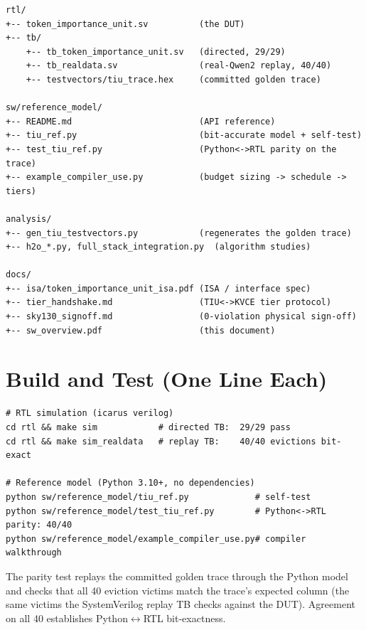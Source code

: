 \documentclass[11pt]{article}
\begin{document}
\begin{lstlisting}[basicstyle=\ttfamily\small]
rtl/
+-- token_importance_unit.sv          (the DUT)
+-- tb/
    +-- tb_token_importance_unit.sv   (directed, 29/29)
    +-- tb_realdata.sv                (real-Qwen2 replay, 40/40)
    +-- testvectors/tiu_trace.hex     (committed golden trace)

sw/reference_model/
+-- README.md                         (API reference)
+-- tiu_ref.py                        (bit-accurate model + self-test)
+-- test_tiu_ref.py                   (Python<->RTL parity on the trace)
+-- example_compiler_use.py           (budget sizing -> schedule -> tiers)

analysis/
+-- gen_tiu_testvectors.py            (regenerates the golden trace)
+-- h2o_*.py, full_stack_integration.py  (algorithm studies)

docs/
+-- isa/token_importance_unit_isa.pdf (ISA / interface spec)
+-- tier_handshake.md                 (TIU<->KVCE tier protocol)
+-- sky130_signoff.md                 (0-violation physical sign-off)
+-- sw_overview.pdf                   (this document)
\end{lstlisting}

\section{Build and Test (One Line Each)}
\label{sec:build}

\begin{lstlisting}[basicstyle=\ttfamily\small]
# RTL simulation (icarus verilog)
cd rtl && make sim            # directed TB:  29/29 pass
cd rtl && make sim_realdata   # replay TB:    40/40 evictions bit-exact

# Reference model (Python 3.10+, no dependencies)
python sw/reference_model/tiu_ref.py             # self-test
python sw/reference_model/test_tiu_ref.py        # Python<->RTL parity: 40/40
python sw/reference_model/example_compiler_use.py# compiler walkthrough
\end{lstlisting}

\noindent The parity test replays the committed golden trace through the Python
model and checks that all 40 eviction victims match the trace's expected column
(the same victims the SystemVerilog replay TB checks against the DUT). Agreement
on all 40 establishes Python$\leftrightarrow$RTL bit-exactness.

\end{document}
